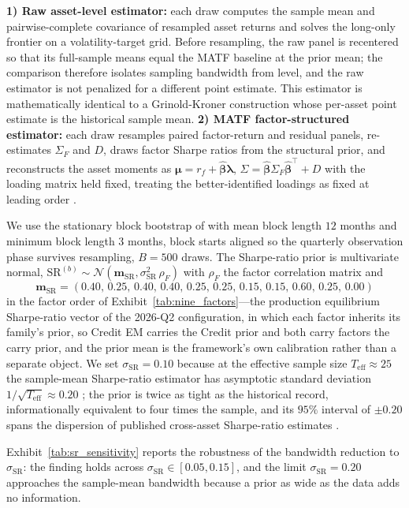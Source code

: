 \documentclass[pdftex,12pt,a4paper]{article}
\begin{document}
\textbf{1) Raw asset-level estimator:} each draw computes the sample mean and pairwise-complete covariance of resampled asset returns and solves the long-only frontier on a volatility-target grid. Before resampling, the raw panel is recentered so that its full-sample means equal the MATF baseline at the prior mean; the comparison therefore isolates sampling bandwidth from level, and the raw estimator is not penalized for a different point estimate. This estimator is mathematically identical to a Grinold-Kroner construction whose per-asset point estimate is the historical sample mean. \textbf{2) MATF factor-structured estimator:} each draw resamples paired factor-return and residual panels, re-estimates $\Sigma_F$ and $D$, draws factor Sharpe ratios from the structural prior, and reconstructs the asset moments as $\boldsymbol\mu = r_f + \hat{\boldsymbol\beta}\boldsymbol\lambda$, $\Sigma = \hat{\boldsymbol\beta}\Sigma_F\hat{\boldsymbol\beta}^\intercal + D$ with the loading matrix held fixed, treating the better-identified loadings as fixed at leading order \citep{Shanken1992,ChopraZiemba1993}.

We use the stationary block bootstrap of \cite{PolitisRomano1994} with mean block length $12$ months and minimum block length $3$ months, block starts aligned so the quarterly observation phase survives resampling, $B=500$ draws. The Sharpe-ratio prior is multivariate normal, $\mathrm{SR}^{(b)} \sim \mathcal{N}(\boldsymbol m_{\mathrm{SR}}, \sigma_{\mathrm{SR}}^2\,\rho_F)$ with $\rho_F$ the factor correlation matrix and
\[
\boldsymbol m_{\mathrm{SR}} = (0.40,\, 0.25,\, 0.40,\, 0.40,\, 0.25,\, 0.25,\, 0.15,\, 0.15,\, 0.60,\, 0.25,\, 0.00)
\]
in the factor order of Exhibit~\ref{tab:nine_factors}---the production equilibrium Sharpe-ratio vector of the 2026-Q2 configuration, in which each factor inherits its family's prior, so Credit EM carries the Credit prior and both carry factors the carry prior, and the prior mean is the framework's own calibration rather than a separate object. We set $\sigma_{\mathrm{SR}} = 0.10$ because at the effective sample size $T_{\mathrm{eff}} \approx 25$ the sample-mean Sharpe-ratio estimator has asymptotic standard deviation $1/\sqrt{T_{\mathrm{eff}}} \approx 0.20$ \citep{Lo2002}; the prior is twice as tight as the historical record, informationally equivalent to four times the sample, and its $95\%$ interval of $\pm 0.20$ spans the dispersion of published cross-asset Sharpe-ratio estimates \citep{Ilmanen2011}.

Exhibit~\ref{tab:sr_sensitivity} reports the robustness of the bandwidth reduction to $\sigma_{\mathrm{SR}}$: the finding holds across $\sigma_{\mathrm{SR}} \in [0.05, 0.15]$, and the limit $\sigma_{\mathrm{SR}} = 0.20$ approaches the sample-mean bandwidth because a prior as wide as the data adds no information.
\end{document}
